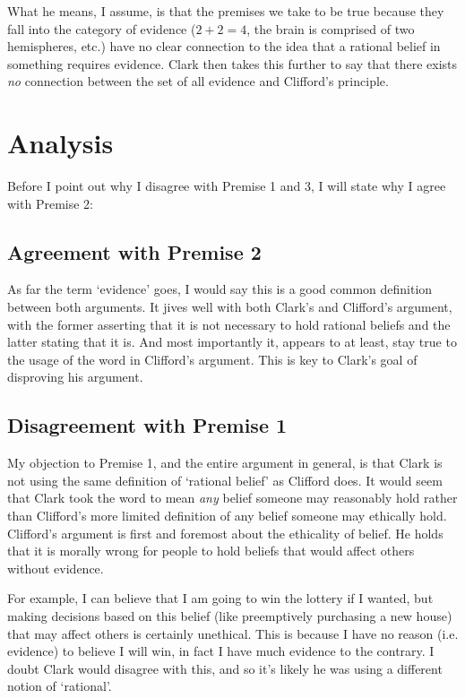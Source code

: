 \documentclass{article}
\begin{document}
What he means, I assume, is that the premises we take to be true because they fall into the category of evidence ($2+2=4$, the brain is comprised of two hemispheres, etc.) have no clear connection to the idea that a rational belief in something requires evidence. Clark then takes this further to say that there exists \textit{no} connection between the set of all evidence and Clifford's principle.


\section{Analysis}
Before I point out why I disagree with Premise 1 and 3, I will state why I agree with Premise 2:
\subsection{Agreement with Premise 2}
As far the term `evidence' goes, I would say this is a good common definition between both arguments. It jives well with both Clark's and Clifford's argument, with the former asserting that it is not necessary to hold rational beliefs and the latter stating that it is. And most importantly it, appears to at least, stay true to the usage of the word in Clifford's argument. This is key to Clark's goal of disproving his argument.

\subsection{Disagreement with Premise 1}
My objection to Premise 1, and the entire argument in general, is that Clark is not using the same definition of `rational belief' as Clifford does. It would seem that Clark took the word to mean \textit{any} belief someone may reasonably hold rather than Clifford's more limited definition of any belief someone may ethically hold. Clifford's argument is first and foremost about the ethicality of belief. He holds that it is morally wrong for people to hold beliefs that would affect others without evidence.

For example, I can believe that I am going to win the lottery if I wanted, but making decisions based on this belief (like preemptively purchasing a new house) that may affect others is certainly unethical. This is because I have no reason (i.e. evidence) to believe I will win, in fact I have much evidence to the contrary. I doubt Clark would disagree with this, and so it's likely he was using a different notion of `rational'.
\end{document}

